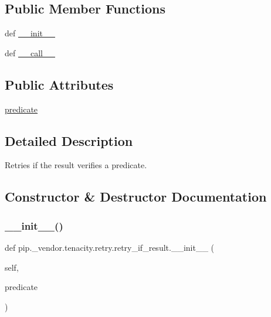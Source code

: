 \subsection*{Public Member Functions}
\begin{DoxyCompactItemize}
\item 
def \hyperlink{classpip_1_1__vendor_1_1tenacity_1_1retry_1_1retry__if__result_a340a55b52d7daaf94d194eb649d91ee6}{\+\_\+\+\_\+init\+\_\+\+\_\+}
\item 
def \hyperlink{classpip_1_1__vendor_1_1tenacity_1_1retry_1_1retry__if__result_adee4c10fa05a85570d81f1b6525b3ff0}{\+\_\+\+\_\+call\+\_\+\+\_\+}
\end{DoxyCompactItemize}
\subsection*{Public Attributes}
\begin{DoxyCompactItemize}
\item 
\hyperlink{classpip_1_1__vendor_1_1tenacity_1_1retry_1_1retry__if__result_a7503453a10ad1ee781869f8b5d3d40be}{predicate}
\end{DoxyCompactItemize}


\subsection{Detailed Description}
\begin{DoxyVerb}Retries if the result verifies a predicate.\end{DoxyVerb}
 

\subsection{Constructor \& Destructor Documentation}
\mbox{\label{classpip_1_1__vendor_1_1tenacity_1_1retry_1_1retry__if__result_a340a55b52d7daaf94d194eb649d91ee6}} 
\subsubsection{\texorpdfstring{\+\_\+\+\_\+init\+\_\+\+\_\+()}{\_\_init\_\_()}}
{\footnotesize\ttfamily def pip.\+\_\+vendor.\+tenacity.\+retry.\+retry\+\_\+if\+\_\+result.\+\_\+\+\_\+init\+\_\+\+\_\+ (\begin{DoxyParamCaption}\item[{}]{self,  }\item[{}]{predicate }\end{DoxyParamCaption})}



